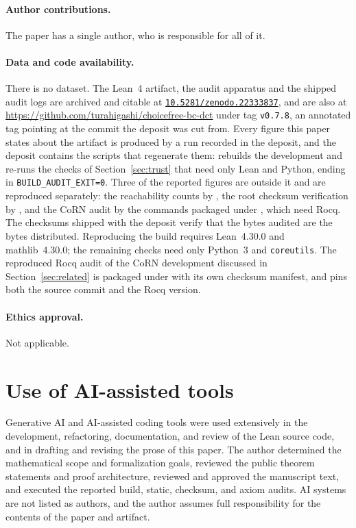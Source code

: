 \documentclass[11pt]{article}
\theoremstyle{definition}
\theoremstyle{remark}
\newcommand{\doi}[1]{\href{https://doi.org/#1}{\texttt{#1}}}
\begin{document}
\paragraph{Author contributions.}  The paper has a single author, who is responsible
for all of it.

\paragraph{Data and code availability.}  There is no dataset.  The Lean~4 artifact,
the audit apparatus and the shipped audit logs are archived and citable at
\doi{10.5281/zenodo.22333837}, and are also at
\url{https://github.com/turahigashi/choicefree-bc-dct} under tag \texttt{v0.7.8},
an annotated tag pointing at the commit the deposit was cut from.  Every figure this paper states about
the artifact is produced by a run recorded in the deposit, and the deposit contains
the scripts that regenerate them:  rebuilds the development
and re-runs the checks of Section~\ref{sec:trust} that need only Lean and Python,
ending in \texttt{BUILD\_AUDIT\_EXIT=0}.  Three of the reported figures are outside
it and are reproduced separately: the reachability counts by
, the root checksum verification by
, and the CoRN audit by the commands packaged under
, which need Rocq.  The checksums shipped with the deposit verify
that the bytes audited are the bytes distributed.  Reproducing the build requires
Lean~4.30.0 and mathlib~4.30.0; the remaining checks need only Python~3 and
\texttt{coreutils}.  The reproduced Rocq audit of the CoRN development discussed in
Section~\ref{sec:related} is packaged under  with its own
checksum manifest, and pins both the source commit and the Rocq version.

\paragraph{Ethics approval.}  Not applicable.

\section*{Use of AI-assisted tools}
Generative AI and AI-assisted coding tools were used extensively in the development, refactoring, documentation, and review of the Lean source code, and in drafting and revising the prose of this paper.  The author determined the mathematical scope and formalization goals, reviewed the public theorem statements and proof architecture, reviewed and approved the manuscript text, and executed the reported build, static, checksum, and axiom audits.  AI systems are not listed as authors, and the author assumes full responsibility for the contents of the paper and artifact.
\end{document}
